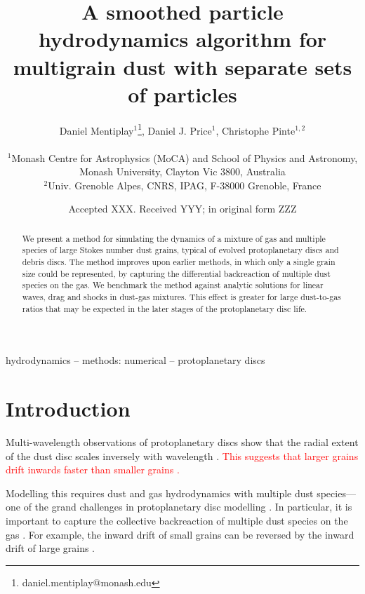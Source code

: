 \documentclass[fleqn,usenatbib]{mnras}
\title[SPH for multigrain dust]{A smoothed particle hydrodynamics algorithm for
multigrain dust with separate sets of particles}
\author[Mentiplay, Price, \& Pinte]{%
   \parbox{\textwidth}{%
      Daniel Mentiplay\(^{1}\)\thanks{daniel.mentiplay@monash.edu},
      Daniel J. Price\(^{1}\),
      Christophe Pinte\(^{1,2}\)
   }\\
   \(^{1}\)Monash Centre for Astrophysics (MoCA) and School of Physics and
   Astronomy, Monash University, Clayton Vic 3800, Australia \\
   \(^{2}\)Univ. Grenoble Alpes, CNRS, IPAG, F-38000 Grenoble, France
}
\date{Accepted XXX. Received YYY; in original form ZZZ}
\begin{document}
\label{firstpage}
\pagerange{\pageref{firstpage}--\pageref{lastpage}}
\maketitle

\begin{abstract}
   We present a method for simulating the dynamics of a mixture of gas and
   multiple species of large Stokes number dust grains, typical of evolved
   protoplanetary discs and debris discs. The method improves upon earlier
   methods, in which only a single grain size could be represented, by capturing
   the differential backreaction of multiple dust species on the gas. We
   benchmark the method against analytic solutions for linear waves, drag and
   shocks in dust-gas mixtures. This effect is greater for large dust-to-gas
   ratios that may be expected in the later stages of the protoplanetary disc
   life.
\end{abstract}

\begin{keywords}
hydrodynamics -- methods: numerical -- protoplanetary discs
\end{keywords}



\section{Introduction}

Multi-wavelength observations of protoplanetary discs show that the radial
extent of the dust disc scales inversely with wavelength
\citep{Andrews2015PASP..127..961A}. \textcolor{red}{This suggests that larger
grains drift inwards faster than smaller grains
\citep{Weidenschilling1977MNRAS.180...57W}.}

Modelling this requires dust and gas hydrodynamics with multiple dust
species---one of the grand challenges in protoplanetary disc modelling
\citep{Haworth2016PASA...33...53H}. In particular, it is important to capture
the collective backreaction of multiple dust species on the gas
\citep{Dipierro2018MNRAS.479.4187D}. For example, the inward drift of small
grains can be reversed by the inward drift of large grains
\citep{Laibe2014MNRAS.444.1940L}.
\end{document}
